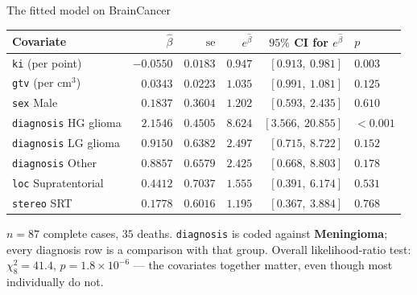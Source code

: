 \documentclass[aspectratio=169,11pt]{beamer}
\begin{document}
\begin{frame}{The fitted model on BrainCancer}
  \footnotesize
  \begin{center}
  \begin{tabular}{@{}lrrrrl@{}}
    \toprule
    \textbf{Covariate} & $\hat\beta$ & $\mathrm{se}$ & $e^{\hat\beta}$ &
    \textbf{$95\%$ CI for} $e^{\hat\beta}$ & $p$ \\
    \midrule
    \texttt{ki} (per point)            & $-0.0550$ & $0.0183$ & $0.947$ & $[0.913,\ 0.981]$ & $0.003$ \\
    \texttt{gtv} (per cm$^3$)          & $\ \ 0.0343$ & $0.0223$ & $1.035$ & $[0.991,\ 1.081]$ & $0.125$ \\
    \texttt{sex} Male                  & $\ \ 0.1837$ & $0.3604$ & $1.202$ & $[0.593,\ 2.435]$ & $0.610$ \\
    \texttt{diagnosis} HG glioma       & $\ \ 2.1546$ & $0.4505$ & $8.624$ & $[3.566,\ 20.855]$ & $<0.001$ \\
    \texttt{diagnosis} LG glioma       & $\ \ 0.9150$ & $0.6382$ & $2.497$ & $[0.715,\ 8.722]$ & $0.152$ \\
    \texttt{diagnosis} Other           & $\ \ 0.8857$ & $0.6579$ & $2.425$ & $[0.668,\ 8.803]$ & $0.178$ \\
    \texttt{loc} Supratentorial        & $\ \ 0.4412$ & $0.7037$ & $1.555$ & $[0.391,\ 6.174]$ & $0.531$ \\
    \texttt{stereo} SRT                & $\ \ 0.1778$ & $0.6016$ & $1.195$ & $[0.367,\ 3.884]$ & $0.768$ \\
    \bottomrule
  \end{tabular}
  \end{center}
  \begin{readme}
    $n=87$ complete cases, $35$ deaths. \texttt{diagnosis} is coded against
    \textbf{Meningioma}; every diagnosis row is a comparison with that group. Overall
    likelihood-ratio test: $\chi^2_8=41.4$, $p=1.8\times10^{-6}$ --- the covariates
    together matter, even though most individually do not.
  \end{readme}
\end{frame}
\end{document}
